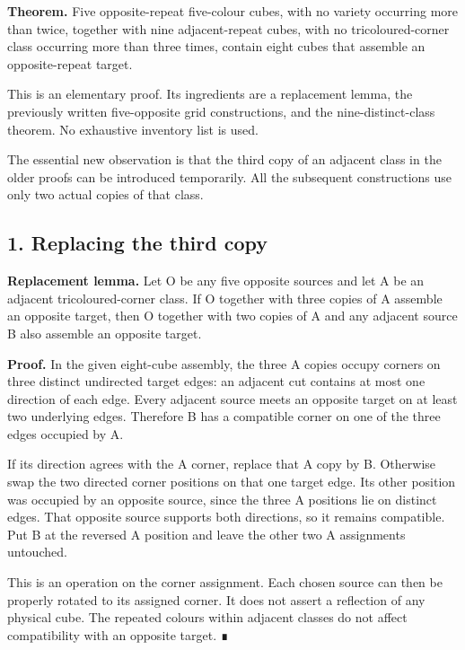 \documentclass[
  10pt,
]{article}
\begin{document}
\textbf{Theorem.} Five opposite-repeat five-colour cubes, with no
variety occurring more than twice, together with nine adjacent-repeat
cubes, with no tricoloured-corner class occurring more than three times,
contain eight cubes that assemble an opposite-repeat target.

This is an elementary proof. Its ingredients are a replacement lemma,
the previously written five-opposite grid constructions, and the
nine-distinct-class theorem. No exhaustive inventory list is used.

The essential new observation is that the third copy of an adjacent
class in the older proofs can be introduced temporarily. All the
subsequent constructions use only two actual copies of that class.

\hypertarget{replacing-the-third-copy}{%
\subsection*{1. Replacing the third
copy}\label{replacing-the-third-copy}}

\textbf{Replacement lemma.} Let O be any five opposite sources and let A
be an adjacent tricoloured-corner class. If O together with three copies
of A assemble an opposite target, then O together with two copies of A
and any adjacent source B also assemble an opposite target.

\textbf{Proof.} In the given eight-cube assembly, the three A copies
occupy corners on three distinct undirected target edges: an adjacent
cut contains at most one direction of each edge. Every adjacent source
meets an opposite target on at least two underlying edges. Therefore B
has a compatible corner on one of the three edges occupied by A.

If its direction agrees with the A corner, replace that A copy by B.
Otherwise swap the two directed corner positions on that one target
edge. Its other position was occupied by an opposite source, since the
three A positions lie on distinct edges. That opposite source supports
both directions, so it remains compatible. Put B at the reversed A
position and leave the other two A assignments untouched.

This is an operation on the corner assignment. Each chosen source can
then be properly rotated to its assigned corner. It does not assert a
reflection of any physical cube. The repeated colours within adjacent
classes do not affect compatibility with an opposite target. ∎
\end{document}
